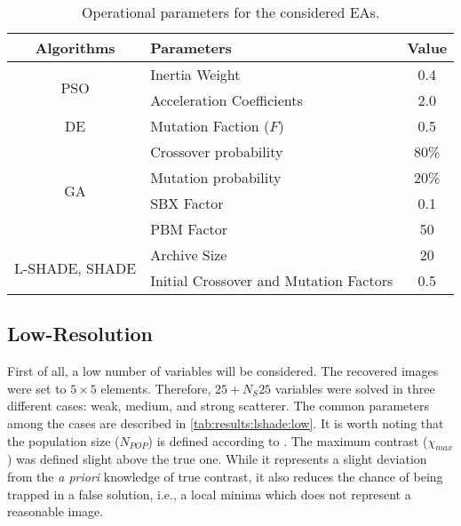 		\begin{table}
			\centering
			\def\arraystretch{1.5}
			\caption{Operational parameters for the considered EAs.}
			\begin{tabular}{clc}
				\textbf{Algorithms}                       & \textbf{Parameters}                             & \textbf{Value} \\\hline\hline
				\multirow{2}{*}{PSO}           			 & Inertia Weight                         			  & 0.4   \\
																	 & Acceleration Coefficients              		& 2.0   \\\hline
				DE                              		 		   & Mutation Faction ($F$)                   	  & 0.5   \\\hline
				\multirow{4}{*}{GA}             		  & Crossover probability                  		   & 80\%  \\
																	 & Mutation probability                   		   & 20\%  \\
																	 & SBX Factor                             			   & 0.1   \\
																	 & PBM Factor                             			   & 50    \\\hline
				\multirow{2}{*}{L-SHADE, SHADE} & Archive Size                           			  & 20    \\
																	  & Initial Crossover and Mutation Factors & 0.5  
			\end{tabular}
			\label{tab:results:algparameters}
		\end{table}
		
		\subsection{Low-Resolution}\label{chap:results:lshade:low}

			First of all, a low number of variables will be considered. The recovered images were set to $5\times5$ elements. Therefore, $25+N_S25$ variables were solved in three different cases: weak, medium, and strong scatterer. The common parameters among the cases are described in \autoref{tab:results:lshade:low}. It is worth noting that the population size ($N_{POP}$) is defined according to \citep{salucci2017multifrequency}. The maximum contrast ($\chi_{max}$) was defined slight above the true one. While it represents a slight deviation from the \textit{a priori} knowledge of true contrast, it also reduces the chance of being trapped in a false solution, i.e., a local minima which does not represent a reasonable image.
			

